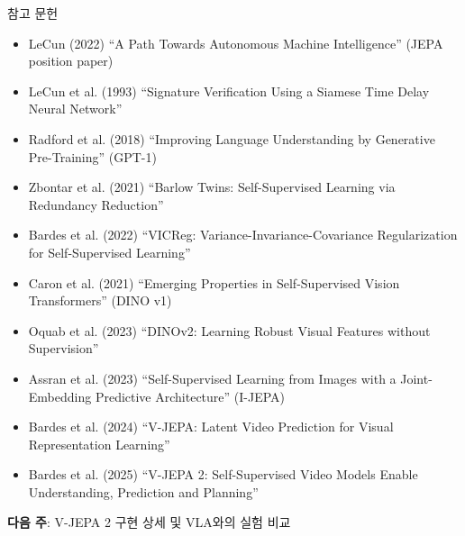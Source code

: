 \documentclass[aspectratio=169,10pt]{beamer}
\begin{document}
\begin{frame}{참고 문헌}
\footnotesize
\begin{itemize}
  \item LeCun (2022) ``A Path Towards Autonomous Machine Intelligence'' (JEPA position paper)
  \item LeCun et al. (1993) ``Signature Verification Using a Siamese Time Delay Neural Network''
  \item Radford et al. (2018) ``Improving Language Understanding by Generative Pre-Training'' (GPT-1)
  \item Zbontar et al. (2021) ``Barlow Twins: Self-Supervised Learning via Redundancy Reduction''
  \item Bardes et al. (2022) ``VICReg: Variance-Invariance-Covariance Regularization for Self-Supervised Learning''
  \item Caron et al. (2021) ``Emerging Properties in Self-Supervised Vision Transformers'' (DINO v1)
  \item Oquab et al. (2023) ``DINOv2: Learning Robust Visual Features without Supervision''
  \item Assran et al. (2023) ``Self-Supervised Learning from Images with a Joint-Embedding Predictive Architecture'' (I-JEPA)
  \item Bardes et al. (2024) ``V-JEPA: Latent Video Prediction for Visual Representation Learning''
  \item Bardes et al. (2025) ``V-JEPA 2: Self-Supervised Video Models Enable Understanding, Prediction and Planning''
\end{itemize}

\vspace{0.8em}
\centering
\textbf{다음 주}: V-JEPA 2 구현 상세 및 VLA와의 실험 비교
\end{frame}
\end{document}
